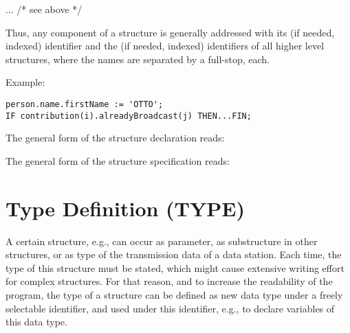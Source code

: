   ...\code{;}  /* see above */

Thus, any component of a structure is generally addressed with its (if
needed, indexed) identifier and the (if needed, indexed) identifiers of
all higher level structures, where the names are separated by a full-stop,
each.

Example:

\begin{lstlisting}
person.name.firstName := 'OTTO';
IF contribution(i).alreadyBroadcast(j) THEN...FIN;
\end{lstlisting}

The general form of the structure declaration reads:

\begin{grammarframe}



\end{grammarframe}

The general form of the structure specification reads:

\begin{grammarframe}
\end{grammarframe}

\section{Type Definition (TYPE)} %
\label{sec_type}

A certain structure, e.g., can occur as parameter, as substructure in other
structures, or as type of the transmission data of a data station.  Each
time, the type of this structure must be stated, which might cause
extensive writing effort for complex structures. For that reason, and to
increase the readability of the program, the type of a structure can be
defined as new data type under a freely selectable identifier, and used
under this identifier, e.g., to declare variables of this data type.

